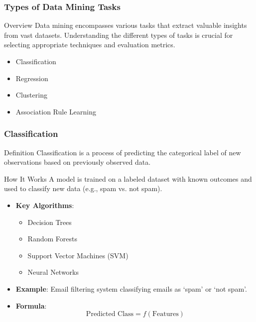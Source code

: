 \documentclass[aspectratio=169]{beamer}
\begin{document}
\begin{frame}[fragile]
    \frametitle{Types of Data Mining Tasks}
    \begin{block}{Overview}
        Data mining encompasses various tasks that extract valuable insights from vast datasets. Understanding the different types of tasks is crucial for selecting appropriate techniques and evaluation metrics.
    \end{block}
    \begin{itemize}
        \item Classification
        \item Regression
        \item Clustering
        \item Association Rule Learning
    \end{itemize}
\end{frame}

\begin{frame}[fragile]
    \frametitle{Classification}
    \begin{block}{Definition}
        Classification is a process of predicting the categorical label of new observations based on previously observed data.
    \end{block}
    \begin{block}{How It Works}
        A model is trained on a labeled dataset with known outcomes and used to classify new data (e.g., spam vs. not spam).
    \end{block}
    \begin{itemize}
        \item \textbf{Key Algorithms}:
        \begin{itemize}
            \item Decision Trees
            \item Random Forests
            \item Support Vector Machines (SVM)
            \item Neural Networks
        \end{itemize}
        \item \textbf{Example}: Email filtering system classifying emails as ‘spam’ or ‘not spam’.
        \item \textbf{Formula}:
        \begin{equation}
            \text{Predicted Class} = f(\text{Features})
        \end{equation}
    \end{itemize}
\end{frame}
\end{document}

